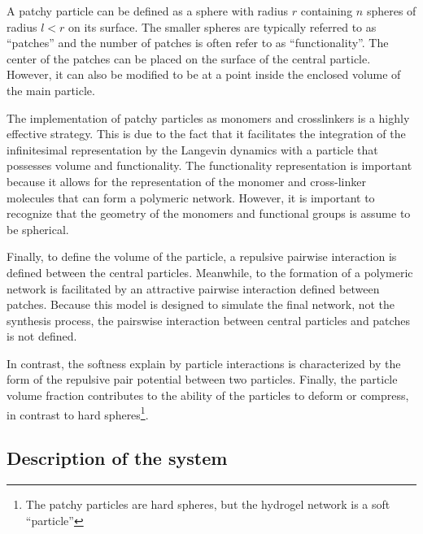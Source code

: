 A patchy particle\citep{bianchiPhaseDiagramPatchy2006,bianchiTheoreticalNumericalStudy2008} can be defined as a sphere with radius $r$ containing $n$ spheres of radius $l<r$ on its surface.
The smaller spheres are typically referred to as ``patches'' and the number of patches is often refer to as ``functionality''.
The center of the patches can be placed on the surface of the central particle. 
However, it can also be modified to be at a point inside the enclosed volume of the main particle.

The implementation of patchy particles as monomers and crosslinkers is a highly effective strategy.
This is due to the fact that it facilitates the integration of the infinitesimal representation by the Langevin dynamics with a particle that possesses volume and functionality.
The functionality representation is important because it allows for the representation of the monomer and cross-linker molecules that can form a polymeric network.
However, it is important to recognize that the geometry of the monomers and functional groups is assume to be spherical.

Finally, to define the volume of the particle, a repulsive pairwise interaction is defined between the central particles.
Meanwhile, to the formation of a polymeric network is facilitated by an attractive pairwise interaction defined between patches.
Because this model is designed to simulate the final network, not the synthesis process, the pairswise interaction between central particles and patches is not defined.

In contrast, the softness explain by particle interactions is characterized by the form of the repulsive pair potential between two particles.
Finally, the particle volume fraction contributes to the ability of the particles to deform or compress, in contrast to hard spheres\footnote{The patchy particles are hard spheres, but the hydrogel network is a soft ``particle''}\citep{vlassopoulosTunableRheologyDense2014}.

\subsection{Description of the system}


